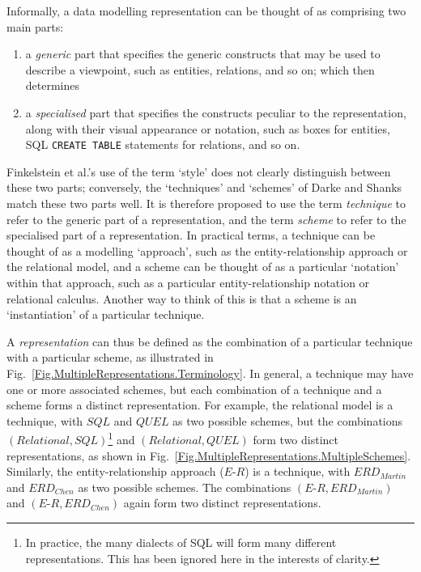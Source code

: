\documentclass[11pt,oribibl]{llncs}
\newcommand{\ER}{\mathit{E\textrm{-}R}}
\newcommand{\Martin}{\mathit{ERD_{Martin}}}
\newcommand{\Chen}{\mathit{ERD_{Chen}}}
\newcommand{\RM}{\mathit{Relational}}
\begin{document}
Informally, a data modelling representation can be thought of as comprising two main parts:
\begin{enumerate}
	\item a \emph{generic} part that specifies the generic constructs that may be used to describe a viewpoint, such as entities, relations, and so on; which then determines
	\item a \emph{specialised} part that specifies the constructs peculiar to the representation, along with their visual appearance or notation, such as boxes for entities, SQL \texttt{CREATE TABLE} statements for relations, and so on.
\end{enumerate}

Finkelstein et al.'s \cite{Fink:ACW:1989} use of the term `style' does not clearly distinguish between these two parts; conversely, the `techniques' and `schemes' of Darke and Shanks \cite{Dark:P:1994:WP21/94} match these two parts well. It is therefore proposed to use the term \emph{technique} to refer to the generic part of a representation, and the term \emph{scheme} to refer to the specialised part of a representation. In practical terms, a technique can be thought of as a modelling `approach', such as the entity-relationship approach or the relational model, and a scheme can be thought of as a particular `notation' within that approach, such as a particular entity-relationship notation or relational calculus. Another way to think of this is that a scheme is an `instantiation' of a particular technique.

A \emph{representation} can thus be defined as the combination of a particular technique with a particular scheme, as illustrated in Fig.~\ref{Fig.MultipleRepresentations.Terminology}. In general, a technique may have one or more associated schemes, but each combination of a technique and a scheme forms a distinct representation. For example, the relational model is a technique, with $\mathit{SQL}$ and $\mathit{QUEL}$ as two possible schemes, but the combinations $(\RM,\mathit{SQL})$\footnote{In practice, the many dialects of SQL will form many different representations. This has been ignored here in the interests of clarity.} and $(\RM,\mathit{QUEL})$ form two distinct representations, as shown in Fig.~\ref{Fig.MultipleRepresentations.MultipleSchemes}. Similarly, the entity-relationship approach ($\ER$) is a technique, with $\Martin$ and $\Chen$ as two possible schemes. The combinations $(\ER,\Martin)$ and $(\ER,\Chen)$ again form two distinct representations.
\end{document}
